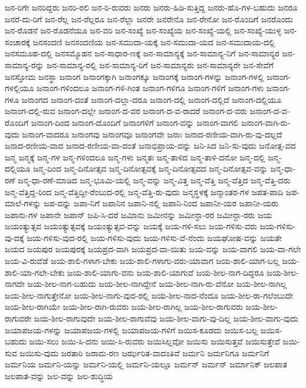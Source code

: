{ಜನ-ರಿಗೇ
ಜನರಿದ್ದರು
ಜನರಿ-ರಲಿ
ಜನ-ರಿ-ರುವರು
ಜನರು
ಜನರು-ಹಿಡಿ-ಸುತ್ತಿದ್ದ
ಜನರು-ಹೊ-ಗಳ-ಬಹುದು
ಜನರೂ
ಜನರೆ-ದು-ರಿಗೆ
ಜನ-ರೆಲ್ಲ
ಜನ-ರೆಲ್ಲರೂ
ಜನ-ರೆಲ್ಲಾ
ಜನರೇ
ಜನರೇನೊ
ಜನ-ರೇನೋ
ಜನ-ರೊಂದಿಗೆ
ಜನರೊಂದು
ಜನ-ರೊಡನೆ
ಜನ-ರೊಡನೆಯೂ
ಜನ-ವರಿ
ಜನ-ಸಂಖ್ಯೆ
ಜನ-ಸಂಖ್ಯೆಯ
ಜನ-ಸಂಖ್ಯೆ-ಯಲ್ಲಿ
ಜನ-ಸಂಖ್ಯೆ-ಯುಳ್ಳ
ಜನ-ಸಂಚಾರಕ್ಕೆ
ಜನಸಂದಣಿ
ಜನಸಂದಣಿಯ
ಜನ-ಸಮುದಾ-ಯಕ್ಕೆ
ಜನ-ಸಮುದಾ-ಯದ
ಜನ-ಸಮುದಾಯ-ದಲ್ಲಿ
ಜನಸಮೂಹ-ದಲ್ಲಿ
ಜನಸಮ್ಮೊಹನ
ಜನ-ಸಾಧಾರ-ಣಕ್ಕೆ
ಜನ-ಸಾಮಾನ್ಯಕ್ಕೆ
ಜನ-ಸಾಮಾನ್ಯ-ನಿಗೆ
ಜನ-ಸಾಮಾನ್ಯರ
ಜನ-ಸಾಮಾನ್ಯ-ರನ್ನು
ಜನ-ಸಾಮಾನ್ಯ-ರಲ್ಲಿ
ಜನ-ಸಾಮಾನ್ಯ-ರಿಗೆ
ಜನ-ಸಾಮಾನ್ಯರು
ಜನ-ಸಾಮಾನ್ಯರೇ
ಜನ-ಸೇವೆಗೆ
ಜನಸ್ತೋಮ
ಜನಸ್ಥಾ
ಜನಾಂಗ
ಜನಾಂಗಕ್ಕಾಗಿ
ಜನಾಂಗಕ್ಕೂ
ಜನಾಂಗಕ್ಕೆ
ಜನಾಂಗ-ಗಳನ್ನು
ಜನಾಂಗ-ಗಳಲ್ಲಿ
ಜನಾಂಗ-ಗಳಲ್ಲಿಯೂ
ಜನಾಂಗ-ಗಳಿಂದಲೂ
ಜನಾಂಗ-ಗಳಿ-ಗಿಂತ
ಜನಾಂಗ-ಗಳಿಗೂ
ಜನಾಂಗ-ಗಳಿಗೆ
ಜನಾಂಗ-ಗಳು
ಜನಾಂಗ-ಗಳೂ
ಜನಾಂಗದ
ಜನಾಂಗ-ದಂತೆ
ಜನಾಂಗ-ದಲ್ಲಾ-ದರೂ
ಜನಾಂಗ-ದಲ್ಲಿ
ಜನಾಂಗ-ದಲ್ಲಿದೆ
ಜನಾಂಗ-ದಲ್ಲಿಯೂ
ಜನಾಂಗ-ದಲ್ಲಿ-ರುವ
ಜನಾಂಗ-ದಲ್ಲೇ
ಜನಾಂಗ-ದ-ವರ
ಜನಾಂಗ-ದ-ವ-ರಾದರೆ
ಜನಾಂಗ-ದ-ವರು
ಜನಾಂಗ-ದ-ವ-ರೊಂದಿಗೆ
ಜನಾಂಗ-ದಿಂದ
ಜನಾಂಗ-ದೊಂದಿಗೆ
ಜನಾಂಗಳಿಗೆ
ಜನಾಂಗ-ವನ್ನು
ಜನಾಂಗ-ವಾಗಲಿ
ಜನಾಂಗ-ವಾಗಿ-ರು-ವುದು
ಜನಾಂಗ-ವಾದರೂ
ಜನಾಂಗವು
ಜನಾಂಗವೂ
ಜನಾಂಗವೇ
ಜನಾಃ
ಜನಾದ-ರಣೀಯ-ವಾಗಿ-ರು-ವು-ದಲ್ಲದೆ
ಜನಾದ-ರಣೀಯ-ವಾದ
ಜನಾದ-ರಣೀಯ-ವಾ-ದಂತೆ
ಜನಾಭಿಪ್ರಾಯ-ವನ್ನು
ಜನಿ-ಸಿದ
ಜನಿ-ಸು-ವುದು
ಜನೋತ್ಸ-ವದ
ಜನ್ಮ
ಜನ್ಮಕ್ಕೆ
ಜನ್ಮ-ಗಳ
ಜನ್ಮ-ಗಳಿಂದಲೂ
ಜನ್ಮ-ಗಳು
ಜನ್ಮತಃ
ಜನ್ಮ-ತಾಳಿದ
ಜನ್ಮ-ತಾಳಿ-ದನೋ
ಜನ್ಮ-ದಲ್ಲಿ
ಜನ್ಮ-ದಲ್ಲಿಯೂ
ಜನ್ಮ-ದಿಂದ
ಜನ್ಮ-ದಿನೋತ್ಸವ
ಜನ್ಮ-ದಿನೋತ್ಸವಕ್ಕೆ
ಜನ್ಮ-ದಿನೋತ್ಸವದ
ಜನ್ಮ-ದಿನೋತ್ಸವ-ವನ್ನು
ಜನ್ಮ-ಧಾ-ರಣೆ
ಜನ್ಮ-ಧಾ-ರಣೆ-ಮಾಡಿದ
ಜನ್ಮ-ಭೂಮಿ-ಯಲ್ಲಿ
ಜನ್ಮ-ವನ್ನು
ಜನ್ಮ-ವಿತ್ತ
ಜನ್ಮ-ವೆತ್ತಿ
ಜನ್ಮ-ವೆತ್ತಿದ
ಜನ್ಮ-ವೆತ್ತಿ-ದರು
ಜನ್ಮ-ವೆತ್ತಿದ್ದ-ರಿಂದ
ಜನ್ಮ-ವೆತ್ತಿದ್ದೀ-ರೆಂಬುದ-ರಲ್ಲಿ
ಜನ್ಮ-ವೆತ್ತಿ-ರು-ವುದು
ಜನ್ಮಸ್ಥಳಕ್ಕೆ
ಜನ್ಮಾಂತರ-ಗಳ
ಜಪತ-ಪಾದಿ
ಜಪ-ಮಾಲೆ-ಗಳನ್ನು
ಜಪ-ವನ್ನು
ಜಪಾ-ನಿಗೆ
ಜಪಾನಿನ
ಜಪಾನಿ-ನಲ್ಲಿ
ಜಪಾನಿ-ನಿಂದ
ಜಪಾನೀ-ಯರ
ಜಪಾನೀ-ಯರು
ಜಪಾನು-ಗಳ
ಜಪಾನೇ
ಜಪಾನ್
ಜಪಿ-ಸಿ-ದರೆ
ಜಮಿಾನು
ಜಮೀನನ್ನು
ಜಮೀನ್ದಾ-ರರ
ಜಮೀನ್ದಾ-ರರು
ಜಯ
ಜಯಂತ್ಯುತ್ಸವ
ಜಯಂತ್ಯುತ್ಸವಕ್ಕೆ
ಜಯಂತ್ಯುತ್ಸವ-ವನ್ನು
ಜಯಕ್ಕೆ
ಜಯ-ಗಳಿ-ಸಲು
ಜಯ-ಗಳಿಸು-ವರು
ಜಯ-ಗಳಿಸು-ವು-ದಕ್ಕೆ
ಜಯ-ಗಳಿಸು-ವುದ-ರಲ್ಲಿ
ಜಯ-ಗಳಿಸು-ವುದು
ಜಯ-ಗಳಿಸು-ವೆ-ನೆಂದು
ಜಯಘೋಷ-ವನ್ನು
ಜಯತೇ
ಜಯದ
ಜಯಪುರ
ಜಯಪುರಕ್ಕೆ
ಜಯಪ್ರದ-ವಾಗಿ
ಜಯಪ್ರದ-ವಾ-ಯಿತು
ಜಯ-ವನ್ನು
ಜಯ-ವಾಗಲಿ
ಜಯ-ವಾ-ಗಲೇ
ಜಯ-ವಿ-ರುವೆಡೆ
ಜಯ-ಶಾಲಿ-ಗಳಾಗ-ಬೇಕು
ಜಯ-ಶಾಲಿ-ಗಳಾಗು-ವರು-ಯಾವಾಗ
ಜಯ-ಶಾಲಿ-ಯಾಗ-ಬಲ್ಲ
ಜಯ-ಶಾಲಿ-ಯಾ-ಗಲೇ-ಬೇಕು
ಜಯ-ಶಾಲಿ-ಯಾಗು-ವನು
ಜಯ-ಶಾಲಿ-ಯಾಗುವೆ
ಜಯ-ಶೀಲ-ನಾಗ-ದಿದ್ದರೂ
ಜಯ-ಶೀಲ-ನಾಗದೇ
ಜಯ-ಶೀಲ-ನಾಗ-ಬಹುದು
ಜಯ-ಶೀಲ-ನಾಗಿದ್ದೇನೆ
ಜಯ-ಶೀಲ-ನಾಗಿ-ರು-ವೆನೋ
ಜಯ-ಶೀಲ-ನಾಗಿಲ್ಲ
ಜಯ-ಶೀಲ-ನಾಗುತ್ತೇನೋ
ಜಯ-ಶೀಲ-ನಾಗು-ವುದ-ರಲ್ಲಿ
ಜಯ-ಶೀಲ-ನಾದ-ನೆಂದೂ
ಜಯ-ಶೀಲ-ರಾ-ಗಲೆಂಬುದೇ
ಜಯ-ಶೀಲ-ರಾಗಿಯೇ
ಜಯ-ಶೀಲ-ರಾಗಿ-ರುವರು
ಜಯ-ಶೀಲ-ರಾಗಿಲ್ಲ
ಜಯ-ಶೀಲ-ರಾಗುವರು
ಜಯ-ಶೀಲ-ರಾಗುವರೇ
ಜಯ-ಶೀಲ-ರಾಗುವುದೇ
ಜಯ-ಶೀಲ-ರಾಗುವೆವು
ಜಯ-ಶೀಲ-ವಾಗು-ವು-ದಿಲ್ಲ
ಜಯ-ಶೀಲ-ವಾಗು-ವುದು
ಜಯಾಪಜಯ-ಗಳನ್ನು
ಜಯಾಪಜಯ-ಗಳಲ್ಲಿ
ಜಯಾಪಜಯ-ಗಳಿಗೆ
ಜಯಿಸ-ಕೂಡದು
ಜಯಿಸ-ಬಲ್ಲ
ಜಯಿಸ-ಬಹುದು
ಜಯಿ-ಸಲು
ಜಯಿ-ಸಿ-ದನು
ಜಯಿ-ಸಿ-ರುವರು
ಜಯಿಸಿಲ್ಲವೋ
ಜಯಿಸು
ಜಯಿಸುತ್ತವೆ
ಜಯಿಸುತ್ತೇವೆ
ಜಯಿ-ಸುವ
ಜಯಿಸು-ವುದು
ಜರತಾರಿ
ಜರಾಮ-ರಣ
ಜರ್ಝರಿತ-ವಾದಂತಿವೆ
ಜರ್ಮನಿ
ಜರ್ಮನಿಗೂ
ಜರ್ಮನಿಗೆ
ಜರ್ಮನಿಯ
ಜರ್ಮನಿ-ಯನ್ನು
ಜರ್ಮನಿ-ಯಲ್ಲಿ
ಜರ್ಮನಿ-ಯಲ್ಲೂ
ಜರ್ಮನ್
ಜರ್ಮನ್
ಜರ್ಮಾನಿಕ್
ಜಲಪಾತ
ಜಲಪಾತ-ವನ್ನು
ಜಲ-ವನ್ನು
ಜಲ-ಶುದ್ಧಿಯ
}
